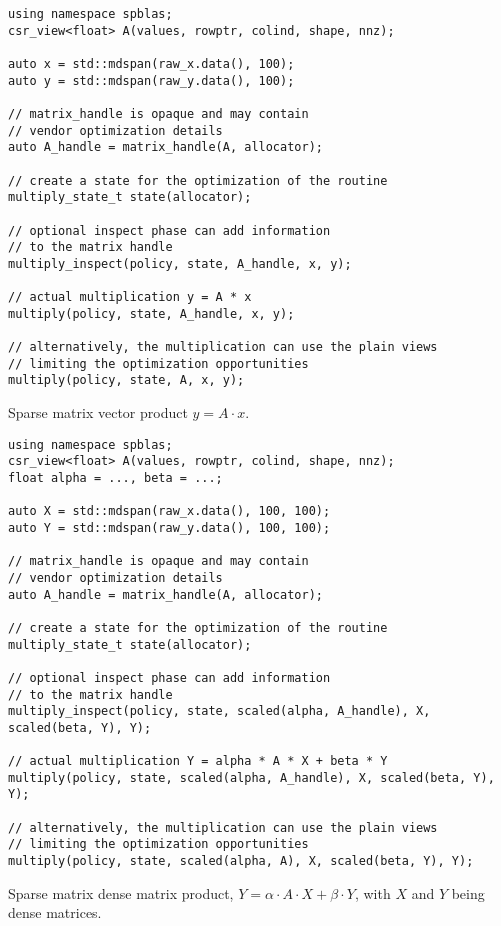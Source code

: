 \documentclass{article}
\begin{document}
\begin{listing}[H]
\begin{verbatim}
using namespace spblas;
csr_view<float> A(values, rowptr, colind, shape, nnz);

auto x = std::mdspan(raw_x.data(), 100);
auto y = std::mdspan(raw_y.data(), 100);

// matrix_handle is opaque and may contain 
// vendor optimization details
auto A_handle = matrix_handle(A, allocator);

// create a state for the optimization of the routine
multiply_state_t state(allocator);

// optional inspect phase can add information 
// to the matrix handle
multiply_inspect(policy, state, A_handle, x, y);

// actual multiplication y = A * x
multiply(policy, state, A_handle, x, y); 

// alternatively, the multiplication can use the plain views
// limiting the optimization opportunities
multiply(policy, state, A, x, y); 
\end{verbatim}
\caption{Sparse matrix vector product $y = A \cdot x$.}
\end{listing}

\begin{listing}[H]
\begin{verbatim}
using namespace spblas;
csr_view<float> A(values, rowptr, colind, shape, nnz);
float alpha = ..., beta = ...;

auto X = std::mdspan(raw_x.data(), 100, 100);
auto Y = std::mdspan(raw_y.data(), 100, 100);

// matrix_handle is opaque and may contain
// vendor optimization details
auto A_handle = matrix_handle(A, allocator);

// create a state for the optimization of the routine
multiply_state_t state(allocator);

// optional inspect phase can add information
// to the matrix handle
multiply_inspect(policy, state, scaled(alpha, A_handle), X, scaled(beta, Y), Y);

// actual multiplication Y = alpha * A * X + beta * Y
multiply(policy, state, scaled(alpha, A_handle), X, scaled(beta, Y), Y); 

// alternatively, the multiplication can use the plain views
// limiting the optimization opportunities
multiply(policy, state, scaled(alpha, A), X, scaled(beta, Y), Y); 
\end{verbatim}
\caption{Sparse matrix dense matrix product, $Y = \alpha \cdot A \cdot X + \beta \cdot Y$, with $X$ and $Y$ being dense matrices.}
\end{listing}
\end{document}
